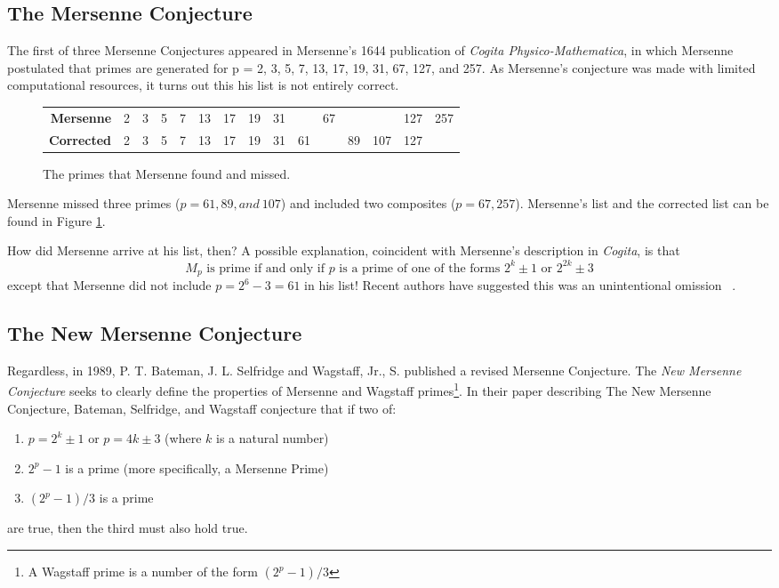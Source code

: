 \subsection{The Mersenne Conjecture}
The first of three Mersenne Conjectures appeared in Mersenne’s 1644 publication of 
\textit{Cogita Physico-Mathematica}, in which Mersenne postulated that primes are generated for p = 2, 3, 5,
7, 13, 17, 19, 31, 67, 127, and 257. As Mersenne's conjecture was made with limited computational
resources, it turns out this his list is not entirely correct.
\begin{figure}[h]
\begin{tabular}{rcccccccccccccc}
\textbf{Mersenne}&2&3&5&7&13&17&19&31&&67&&&127&257\\
\textbf{Corrected}&2&3&5&7&13&17&19&31&61&&89&107&127&
\end{tabular}
\caption{The primes that Mersenne found and missed.}
\label{fig:conj}
\end{figure}

Mersenne missed three primes ($p = 61, 89, and~107$) and included two composites ($p = 67, 257$). Mersenne's list and the corrected list can be found in Figure \ref{fig:conj}.

How did Mersenne arrive at his list, then? A possible explanation, coincident with Mersenne's description in
\textit{Cogita}, is that
\begin{equation*}
    M_p \text{ is prime if and only if $p$ is a prime of one of the forms } 2^k\pm1 \text{ or } 2^{2k}\pm3
\end{equation*}
except that Mersenne did not include $p = 2^{6}-3 = 61$ in his list! Recent authors have
suggested this was an unintentional omission ~\cite{newconjecture}.


\subsection{The New Mersenne Conjecture}

Regardless, in 1989, P. T. Bateman, J. L. Selfridge and Wagstaff, Jr., S. published a revised Mersenne Conjecture.
The \textit{New Mersenne Conjecture} seeks to clearly define the properties of Mersenne and Wagstaff primes\footnote{A Wagstaff prime is a number of the form $(2^p-1)/3$}.
In their paper describing The New Mersenne Conjecture, Bateman, Selfridge, and Wagstaff conjecture that if two of: 
\begin{enumerate}
\item $p = 2^k \pm 1$ or $p = 4k \pm 3$ (where $k$ is a natural number)
\item $2^p - 1$ is a prime (more specifically, a Mersenne Prime)
\item $(2^p - 1)/3$ is a prime
\end{enumerate}
are true, then the third must also hold true.

